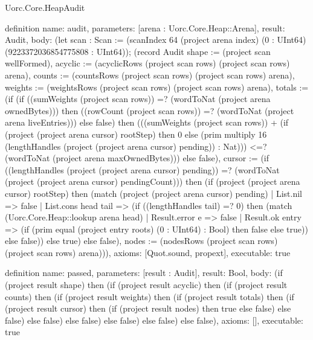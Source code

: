\begin{lexlean}{Uorc.Core.HeapAudit}
\begin{semanticmodule}
definition{
  name: audit,
  parameters: [arena : Uorc.Core.Heap::Arena],
  result: Audit,
  body: (let scan : Scan := (scanIndex 64 (project arena index) (0 : UInt64) (9223372036854775808 : UInt64)); (record Audit {shape := (project scan wellFormed), acyclic := (acyclicRows (project scan rows) (project scan rows) arena), counts := (countsRows (project scan rows) (project scan rows) arena), weights := (weightsRows (project scan rows) (project scan rows) arena), totals := (if (if ((sumWeights (project scan rows)) =? (wordToNat (project arena ownedBytes))) then ((rowCount (project scan rows)) =? (wordToNat (project arena liveEntries))) else false) then (((sumWeights (project scan rows)) + (if (project (project arena cursor) rootStep) then 0 else (prim multiply 16 (lengthHandles (project (project arena cursor) pending)) : Nat))) <=? (wordToNat (project arena maxOwnedBytes))) else false), cursor := (if ((lengthHandles (project (project arena cursor) pending)) =? (wordToNat (project (project arena cursor) pendingCount))) then (if (project (project arena cursor) rootStep) then (match (project (project arena cursor) pending)
    | List.nil => false
    | List.cons head tail => (if ((lengthHandles tail) =? 0) then (match (Uorc.Core.Heap::lookup arena head)
      | Result.error e => false
      | Result.ok entry => (if (prim equal (project entry roots) (0 : UInt64) : Bool) then false else true)) else false)) else true) else false), nodes := (nodesRows (project scan rows) (project scan rows) arena)})),
  axioms: [Quot.sound, propext],
  executable: true
}

definition{
  name: passed,
  parameters: [result : Audit],
  result: Bool,
  body: (if (project result shape) then (if (project result acyclic) then (if (project result counts) then (if (project result weights) then (if (project result totals) then (if (project result cursor) then (if (project result nodes) then true else false) else false) else false) else false) else false) else false) else false),
  axioms: [],
  executable: true
}


\end{semanticmodule}
\end{lexlean}
